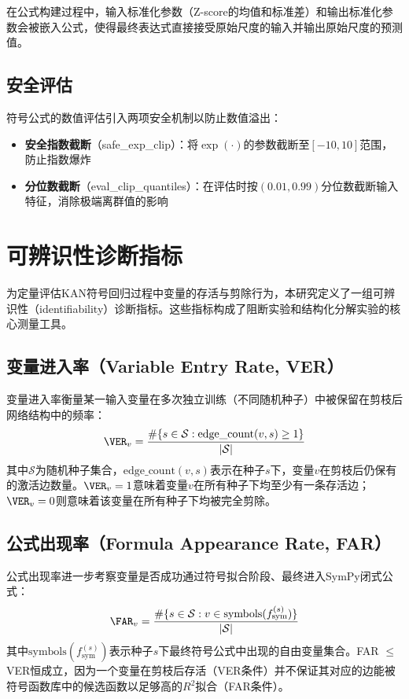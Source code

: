 在公式构建过程中，输入标准化参数（Z-score的均值和标准差）和输出标准化参数会被嵌入公式，使得最终表达式直接接受原始尺度的输入并输出原始尺度的预测值。

\subsection{安全评估}

符号公式的数值评估引入两项安全机制以防止数值溢出：
\begin{itemize}
  \item \textbf{安全指数截断}（safe\_exp\_clip）：将$\exp(\cdot)$的参数截断至$[-10, 10]$范围，防止指数爆炸
  \item \textbf{分位数截断}（eval\_clip\_quantiles）：在评估时按$(0.01, 0.99)$分位数截断输入特征，消除极端离群值的影响
\end{itemize}

\section{可辨识性诊断指标}

为定量评估KAN符号回归过程中变量的存活与剪除行为，本研究定义了一组可辨识性（identifiability）诊断指标。这些指标构成了阻断实验和结构化分解实验的核心测量工具。

\subsection{变量进入率（Variable Entry Rate, VER）}

变量进入率衡量某一输入变量在多次独立训练（不同随机种子）中被保留在剪枝后网络结构中的频率：
\begin{equation}
\VER_v = \frac{\#\{s \in \mathcal{S} : \text{edge\_count}(v, s) \geq 1\}}{|\mathcal{S}|}
\end{equation}
其中$\mathcal{S}$为随机种子集合，$\text{edge\_count}(v, s)$表示在种子$s$下，变量$v$在剪枝后仍保有的激活边数量。$\VER_v = 1$意味着变量$v$在所有种子下均至少有一条存活边；$\VER_v = 0$则意味着该变量在所有种子下均被完全剪除。

\subsection{公式出现率（Formula Appearance Rate, FAR）}

公式出现率进一步考察变量是否成功通过符号拟合阶段、最终进入SymPy闭式公式：
\begin{equation}
\FAR_v = \frac{\#\{s \in \mathcal{S} : v \in \text{symbols}(f_{\text{sym}}^{(s)})\}}{|\mathcal{S}|}
\end{equation}
其中$\text{symbols}(f_{\text{sym}}^{(s)})$表示种子$s$下最终符号公式中出现的自由变量集合。FAR $\leq$ VER恒成立，因为一个变量在剪枝后存活（VER条件）并不保证其对应的边能被符号函数库中的候选函数以足够高的$R^2$拟合（FAR条件）。

